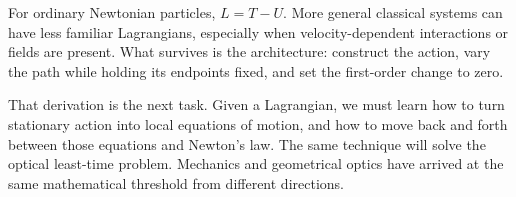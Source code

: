For ordinary Newtonian particles, \(L=T-U\). More general classical systems
can have less familiar Lagrangians, especially when velocity-dependent
interactions or fields are present. What survives is the architecture:
construct the action, vary the path while holding its endpoints fixed, and set
the first-order change to zero.

\begin{classroomqa}

\end{classroomqa}

That derivation is the next task. Given a Lagrangian, we must learn how to turn
stationary action into local equations of motion, and how to move back and
forth between those equations and Newton's law. The same technique will solve
the optical least-time problem. Mechanics and geometrical optics have arrived
at the same mathematical threshold from different directions.
